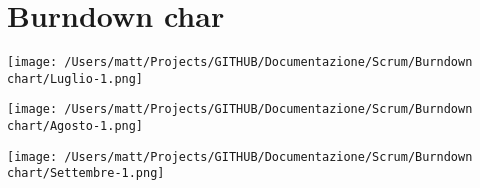 \chapter{Burndown char}

\texttt{[image: /Users/matt/Projects/GITHUB/Documentazione/Scrum/Burndown chart/Luglio-1.png]}

\texttt{[image: /Users/matt/Projects/GITHUB/Documentazione/Scrum/Burndown chart/Agosto-1.png]}

\texttt{[image: /Users/matt/Projects/GITHUB/Documentazione/Scrum/Burndown chart/Settembre-1.png]}
